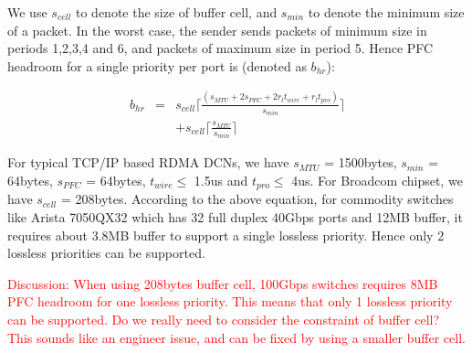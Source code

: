  We use $s_{cell}$ to denote the size of buffer cell, and $s_{min}$ to denote the minimum size of a packet. In the worst case, the sender sends packets of minimum size in periods 1,2,3,4 and 6, and packets of maximum size in period 5. Hence
 PFC headroom for a single priority per port is (denoted as $b_{hr}$):


 \begin{eqnarray} \label{eqn:pfcheadroom}
 b_{hr}  & = &  s_{cell}\lceil\frac{(s_{MTU}+2s_{PFC}+2r_{l}t_{wire}+r_{l}t_{pro})}{s_{min}}\rceil \nonumber   \\
 & & +  s_{cell}\lceil\frac{s_{MTU}}{s_{min}}\rceil
 \end{eqnarray}

For typical TCP/IP based RDMA DCNs, we have $s_{MTU}$ = 1500bytes, $s_{min}$ = 64bytes, $s_{PFC}$ = 64bytes, $t_{wire} \leq$ 1.5us and $t_{pro}\le $ 4us. For Broadcom chipset, we have $s_{cell}$ = 208bytes. According to the above equation, for commodity switches like Arista 7050QX32 which has 32 full duplex 40Gbps ports and 12MB buffer, it requires about 3.8MB buffer to support a single lossless priority. Hence only 2 lossless priorities can be supported.

\textcolor{red}{Discussion: When using 208bytes buffer cell, 100Gbps switches requires 8MB PFC headroom for one lossless priority. This means that only 1 lossless priority can be supported. Do we really need to consider the constraint of buffer cell? This sounds like an engineer issue, and can be fixed by using a smaller buffer cell.}



%
%
%
%

